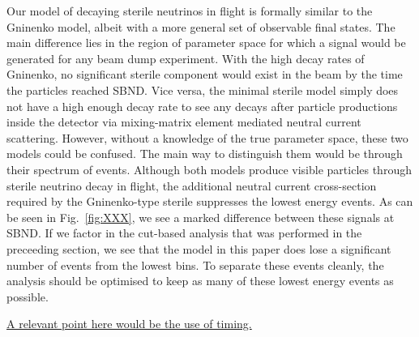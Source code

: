 \documentclass[11pt, a4paper]{article}
\newcommand{\reffig}[1]{Fig.~\ref{#1}}
\newcommand{\newtext}[2]{\textcolor{#1}{\ul{#2}}}
\begin{document}
Our model of decaying sterile neutrinos in flight is formally similar to the
Gninenko model, albeit with a more general set of observable final states. The
main difference lies in the region of parameter space for which a signal would
be generated for any beam dump experiment. With the high decay rates of
Gninenko, no significant sterile component would exist in the beam by the time
the particles reached SBND. Vice versa, the minimal sterile model simply does
not have a high enough decay rate to see any decays after particle productions
inside the detector via mixing-matrix element mediated neutral current
scattering. However, without a knowledge of the true parameter space, these two
models could be confused. The main way to distinguish them would be through
their spectrum of events. Although both models produce visible particles
through sterile neutrino decay in flight, the additional neutral current
cross-section required by the Gninenko-type sterile suppresses the lowest
energy events. As can be seen in \reffig{fig:XXX}, we see a marked difference
between these signals at SBND. If we factor in the cut-based analysis that was
performed in the preceeding section, we see that the model in this paper does
lose a significant number of events from the lowest bins. To separate these
events cleanly, the analysis should be optimised to keep as many of these
lowest energy events as possible. 

\newtext{PB}{A relevant point here would be the use of timing.}
\end{document}
